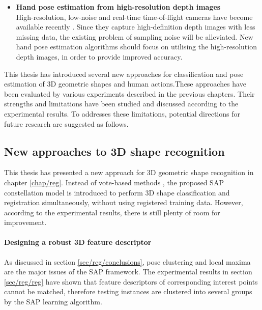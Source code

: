 \begin{itemize}
	\item \textbf{Hand pose estimation from high-resolution depth images}\\
	High-resolution, low-noise and real-time time-of-flight cameras have become available recently \cite{Nair2012}. Since they capture high-definition depth images with less missing data, the existing problem of sampling noise will be alleviated. New hand pose estimation algorithms should focus on utilising the high-resolution depth images, in order to provide improved accuracy.  
\end{itemize}
\fi

This thesis has introduced several new approaches for classification and pose estimation of 3D geometric shapes and human actions.These approaches have been evaluated by various experiments described in the previous chapters. Their strengths and limitations have been studied and discussed according to the experimental results. To addresses these limitations, potential directions for future research are suggested as follows.

\subsection{New approaches to 3D shape recognition}

This thesis has presented a new approach for 3D geometric shape recognition in chapter \ref{chap/reg}. Instead of vote-based methods \cite{Flitton2010, Knopp2010, Pham2011}, the proposed SAP constellation model is introduced to perform 3D shape classification and registration simultaneously, without using registered training data. However, according to the experimental results, there is still plenty of room for improvement. 

\paragraph{Designing a robust 3D feature descriptor}

As discussed in section \ref{sec/reg/conclusions}, pose clustering and local maxima are the major issues of the SAP framework. The experimental results in section \ref{sec/reg/reg} have shown that feature descriptors of corresponding interest points cannot be matched, therefore testing instances are clustered into several groups by the SAP learning algorithm.  

